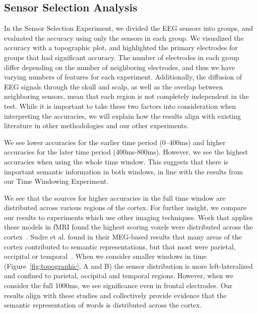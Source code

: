 \subsection{Sensor Selection Analysis}
In the Sensor Selection Experiment, we divided the EEG sensors into groups, and evaluated the \tvt accuracy using only the sensors in each group. We visualized the \tvt accuracy with a topographic plot, and highlighted the primary electrodes for groups that had significant accuracy. The number of electrodes in each group differ depending on the number of neighboring electrodes, and thus we have varying numbers of features for each \tvt experiment. Additionally, the diffusion of EEG signals through the skull and scalp, as well as the overlap between neighboring sensors, mean that each region is not completely independent in the \tvt test. While it is important to take these two factors into consideration when interpreting the accuracies, we will explain how the results align with existing literature in other methodologies and our other experiments.

We see lower \tvt accuracies for the earlier time period (0--400ms) and higher accuracies for the later time period (400ms-800ms). However, we see the highest accuracies when using the whole time window. This suggests that there is important semantic information in both windows, in line with the results from our Time Windowing Experiment.

We see that the sources for higher accuracies in the full time window are distributed across various regions of the cortex. For further insight, we compare our results to experiments which use other imaging techniques. Work that applies these models in fMRI found the highest scoring voxels were distributed across the cortex~\cite{Mitchell2008, pereira2018toward}. Sudre et al. found in their MEG-based results that many areas of the cortex contributed to semantic representations, but that most were parietal, occipital or temporal~\cite{Sudre2012}. When we consider smaller windows in time (Figure~\ref{fig:topographic}, A and B) the sensor distribution is more left-lateralized and confined to parietal, occipital and temporal regions.  However, when we consider the full 1000ms, we see significance even in frontal electrodes.  Our results align with these studies and collectively provide evidence that the semantic representation of words is distributed across the cortex. 
